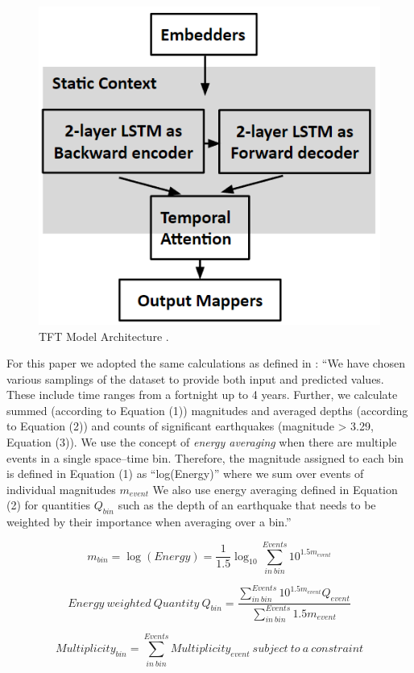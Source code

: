 \documentclass[utf8]{FrontiersinVancouver} %
\begin{document}
\begin{figure}[htb]
    \centering\includegraphics[width=0.5\columnwidth]{images/TFT}
    \caption{TFT Model Architecture \citep{fox2022-jm}.}
    \label{fig:TFT_Model_Arch}
\end{figure}


For this paper we adopted the same calculations as defined in
\cite{fox2022-jm}: ``We have chosen various samplings of the dataset
to provide both input and predicted values. These include time ranges
from a fortnight up to 4 years. Further, we calculate summed
(according to Equation (1)) magnitudes and averaged depths (according
to Equation (2)) and counts of significant earthquakes (magnitude >
3.29, Equation (3)).  We use the concept of {\em energy averaging}
when there are multiple events in a single space–time bin. Therefore,
the magnitude assigned to each bin is defined in Equation (1) as
“log(Energy)” where we sum over events of individual magnitudes
$m_{event}$ We also use energy averaging defined in Equation (2) for
quantities $Q_{bin}$ such as the depth of an earthquake that needs to
be weighted by their importance when averaging over a bin.''

\begin{equation}
m_{bin} = \log(Energy) = \frac{1}{1.5}\log_{10}\sum_{in~bin}^{Events}10^{1.5m_{event}}
\end{equation}

\begin{equation}
Energy~weighted~Quantity~Q_{bin} = \frac{\displaystyle
   \sum^{Events}_{in~bin} 10^{1.5m_{event}} Q_{event}}{\displaystyle \sum^{Events}_{in~bin}1.5m_{event}}
\end{equation}

\begin{equation}
Multiplicity_{bin} = \sum^{Events}_{in~bin}Multiplicity_{event} ~ subject~to~a~constraint
\end{equation}
\end{document}
